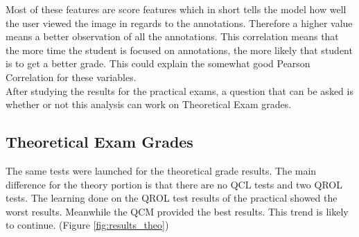 \documentclass[a4paper,11pt]{report}
\numberwithin{figure}{chapter} %
\begin{document}
   Most of these features are score features which in short tells the model how well the user viewed the image in regards to the annotations.
   Therefore a higher value means a better observation of all the annotations.
   This correlation means that the more time the student is focused on annotations, the more likely that student is to get a better grade.
   This could explain the somewhat good Pearson Correlation for these variables.\\

   After studying the results for the practical exams, a question that can be asked is whether or not this analysis can work on Theoretical Exam grades.

    \subsection{Theoretical Exam Grades}

        The same tests were launched for the theoretical grade results.
        The main difference for the theory portion is that there are no QCL tests and two QROL tests.
        The learning done on the QROL test results of the practical showed the worst results.
        Meanwhile the QCM provided the best results.
        This trend is likely to continue. (Figure \ref{fig:results_theo})
\end{document}
